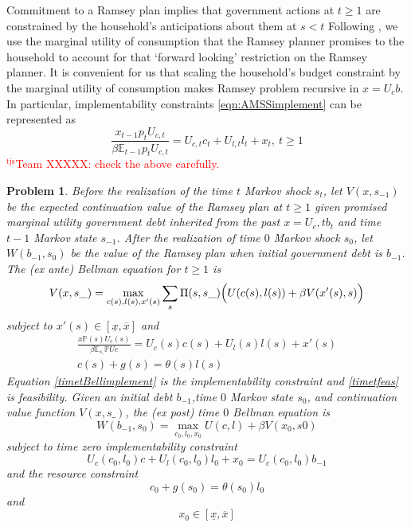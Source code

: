 \documentclass[12pt]{article}
\newcommand{\tjs}[1]{\textcolor{red}{$^{\textrm{tjs}}${#1}}}
\newcommand{\EE}{\mathbb E}
\newtheorem{problem}[theorem]{Problem}
\begin{document}
  Commitment to a Ramsey plan implies that government actions at $t \geq 1$ are constrained by the household's anticipations about them at $s < t$
	 Following \citet{Kydland1980}, we  use the  marginal utility of consumption that the
Ramsey planner promises to the household to account for that `forward looking' restriction on the Ramsey planner.  It is convenient for us that scaling the household's  budget constraint by the  marginal utility
 of consumption makes Ramsey problem  recursive in  $x=U_c b$.  In particular, implementability constraints \eqref{eqn:AMSSimplement}
 can be represented as
		\begin{equation}
		\frac{x_{t-1} p_t U_{c,t}}{\beta \EE_{t-1} p_t U_{c,t}}  = U_{c,t}c_t+U_{l,t} l_t + x_t, \ t \geq 1
	\end{equation}
\tjs{Team XXXXX: check the above carefully.}


\begin{problem}\label{prob:RamseyBellman}
Before the realization of the time $t$ Markov shock $s_t$, let   $V(x, s_{-1})$ be the {\em expected} continuation value of the Ramsey plan at $t \geq 1$  given promised marginal utility government debt inherited
from the past $x = U_c,t b_t $ and time $t-1$ Markov state $s_{-1}$.
After the realization of time $0$ Markov shock $s_0$, let $W(b_{-1},s_0)$ be the value of the Ramsey plan when initial
government debt is $b_{-1}$. %
The (\textit{ex ante}) Bellman equation for $t\geq1$  is
	\begin{equation}\label{eqn:Bellman1}
		V(x,s\_) = \max_{c(s),l(s),x'(s)} \sum_s \Pi(s,s\_)\Bigl(U(c(s),l(s)) + \beta V(x'(s),s)\Bigr)
	\end{equation}
subject to $x'(s)\in [\underline x,\overline x]$ and
	\begin{align}
		\frac{x \mathbb{P}(s) U_c(s)}{\beta\EE_{s\_} \mathbb{P}Uc} =U_c(s)c(s)+U_l(s)l(s) + x'(s) \label{timetBellimplement}\\
		c(s) + g(s) = \theta(s)l(s) \label{timetfeas}
	\end{align}
Equation \eqref{timetBellimplement} is the implementability constraint and \eqref{timetfeas} is feasibility.
	Given an initial  debt $b_{-1}$,time $0$ Markov state $s_0$,  and continuation value function $V(x,s\_)$, the (\textit{ex post}) time $0$ Bellman equation is
	\begin{equation}\label{eqn:Bellman0}
		W(b_{-1},s_0) = \max_{c_{0},l_0,x_{0}} U(c,l) +\beta V(x_0,s0)
	\end{equation} subject to  time zero implementability constraint
	\[
		U_{c}(c_0,l_0)c + U_l(c_0,l_0) l_0 + x_0 = U_c(c_0,l_0) b_{-1}
	\]and  the resource constraint
	\[
		c_0+ g(s_0) = \theta(s_0) l_0
	\]and
	\[
		x_0 \in [\underline x,\overline x]
	\]
\end{problem}
\end{document}
